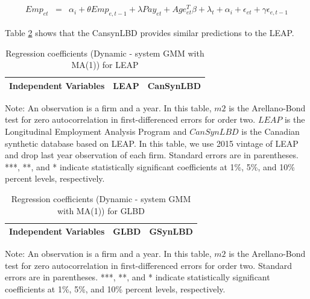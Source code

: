 \begin{eqnarray}	
Emp_{et}&=&\alpha_i +\theta Emp_{e,t-1}+\lambda Pay_{et}+Age_{et}^{T}\beta+\lambda_t+\alpha_i+\epsilon_{et}+\gamma\epsilon_{e,t-1}
\end{eqnarray}

Table \ref{Dynamic - system GMM with MA(1)} shows that the CansynLBD provides similar predictions to the LEAP.

\begin{table}[H]
  \centering
\begin{threeparttable}
 \caption{Regression coefficients (Dynamic - system GMM with MA(1)) for LEAP} \label{Dynamic - system GMM with MA(1)} \medskip
\renewcommand{\arraystretch}{1}
\begin{tabular}{l|c c| c c}
\toprule
\textbf{Independent Variables}&\multicolumn{2}{c|}{\textbf{LEAP}} &  \multicolumn{2}{c}{\textbf{CanSynLBD}}\\
\midrule

   \bottomrule
  \end{tabular} 
\begin{tablenotes}
\small
\item Note: An observation is a firm and a year. In this table, $m2$ is the Arellano-Bond test for zero autocorrelation in first-differenced errors for order two. $LEAP$ is the Longitudinal Employment Analysis Program and $CanSynLBD$ is the Canadian synthetic database based on LEAP. In this table, we use 2015 vintage of LEAP and drop last year observation of each firm. Standard errors are in parentheses. ***, **, and * indicate statistically significant coefficients at 1\%, 5\%, and 10\% percent levels, respectively.
 \end{tablenotes}
 \end{threeparttable}
\end{table}

\begin{table}[H]
  \centering
 \caption{Regression coefficients (Dynamic - system GMM with MA(1)) for GLBD} \label{Dynamic - system GMM with MA(1)} \medskip
\renewcommand{\arraystretch}{1}
\begin{tabular}{l|c| c}
\toprule
\textbf{Independent Variables}&\textbf{GLBD} &\textbf{GSynLBD}\\
\midrule

   \bottomrule
  \end{tabular} 
\begin{tablenotes}
\small
\item Note: An observation is a firm and a year. In this table, $m2$ is the Arellano-Bond test for zero autocorrelation in first-differenced errors for order two. Standard errors are in parentheses. ***, **, and * indicate statistically significant coefficients at 1\%, 5\%, and 10\% percent levels, respectively.
 \end{tablenotes}
\end{table}